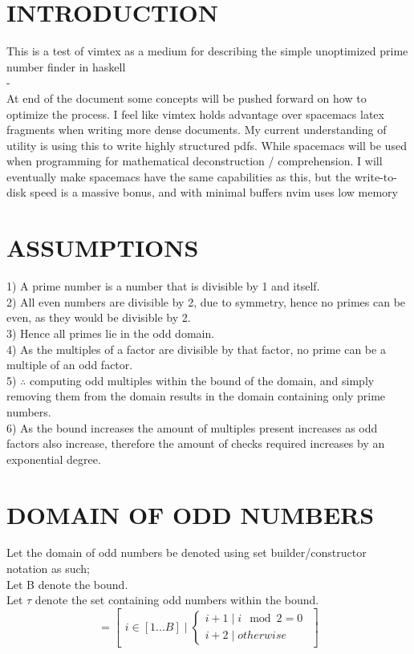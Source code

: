 \documentclass[11pt]{article}
\begin{document}
\maketitle
\newpage

\section{INTRODUCTION}
{This is a test of vimtex as a medium for describing the simple unoptimized prime number finder in haskell} \\
{\color{white}-}\\
At end of the document some concepts will be pushed forward on how to optimize the process.
I feel like vimtex holds advantage over spacemacs latex fragments when writing more dense documents.
My current understanding of utility is using this to write highly structured pdfs. While spacemacs will be used when 
programming for mathematical deconstruction / comprehension.  
I will eventually make spacemacs have the same capabilities as this, but the write-to-disk speed is a massive bonus, and with minimal buffers nvim
uses low memory

\section{ASSUMPTIONS}
1) A prime number is a number that is divisible by 1 and itself.\\
2) All even numbers are divisible by 2, due to symmetry, hence no primes can be even, as they would be divisible by 2.\\
3) Hence all primes lie in the odd domain.\\
4) As the multiples of a factor are divisible by that factor, no prime can be a multiple of an odd factor.\\
5) $\therefore$ computing odd multiples within the bound of the domain, and simply removing them from the domain results in the domain containing
only prime numbers.\\
6) As the bound increases the amount of multiples present increases as odd factors also increase, therefore the amount of checks required increases 
by an exponential degree.

\newpage\section{DOMAIN OF ODD NUMBERS}
Let the domain of odd numbers be denoted using set builder/constructor notation as such;\\
Let B denote the bound.\\
Let $\tau$ denote the set containing odd numbers within the bound.
\begin{equation} [\tau]=\begin{bmatrix}i\in[1...B]\mid\begin{cases} i+1 \mid i \mod 2=0 \\ i+2 \mid otherwise \end{cases}\end{bmatrix} \end{equation}
\end{document}
